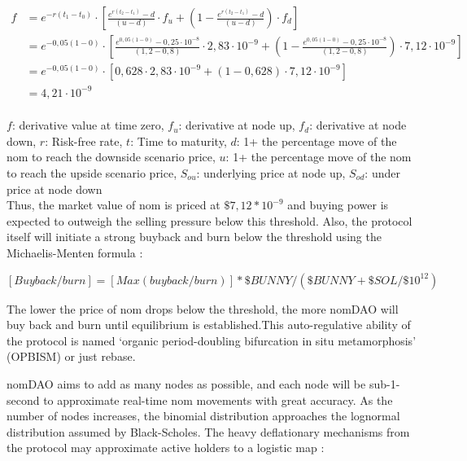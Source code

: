 \documentclass[12pt]{article}
\begin{document}
\begin{equation}\label{black}
\begin{split}
f &=e^{-r(t_{1} -t_{0})} \cdot [\frac{e^{r(t_{2} - t_{1})}-d}{(u-d)} \cdot f_{u} + (1-\frac{e^{r(t_{2} - t_{1})}-d}{(u-d)}) \cdot f_{d}]\\
 &= e^{-0,05(1 - 0)} \cdot [\frac{e^{0,05(1 - 0)}-0,25\cdot10^{-8}}{(1,2-0,8)} \cdot 2,83\cdot10^{-9} + (1-\frac{e^{0,05(1 - 0)}-0,25\cdot10^{-8}}{(1,2-0,8)}) \cdot 7,12\cdot10^{-9}]\\
  &=e^{-0,05(1 - 0)} \cdot [0,628 \cdot 2,83\cdot10^{-9} + (1-0,628) \cdot 7,12\cdot10^{-9}]\\
 &=4,21\cdot10^{-9}
\end{split}
\end{equation}
\\

$f$: derivative value at time zero,
$f_{u}$: derivative at node up,
$f_{d}$: derivative at node down,
$r$: Risk-free rate,
$t$: Time to maturity,
$d$: 1+ the percentage move of the nom to reach the downside scenario price,
$u$:  1+ the percentage move of the nom to reach the upside scenario price,
$S_{ou}$: underlying price at node up,
$S_{od}$: under price at node down\\

Thus, the market value of nom is priced at $\$7,12*10^{-9}$ and buying power is expected to outweigh the selling pressure below this threshold. Also, the protocol itself will initiate a strong buyback and burn below the threshold using the Michaelis-Menten formula \cite{mm}:

\begin{equation}\label{mm}
[Buyback/burn]=[Max (buyback/burn)] * \$BUNNY/ (\$BUNNY+ \$SOL/\$10^{12})
\end{equation}\label{mm}

The lower the price of nom drops below the threshold, the more nomDAO will buy back and burn until equilibrium is established.This auto-regulative ability of the protocol is named ‘organic period-doubling bifurcation in situ metamorphosis’ (OPBISM) or just rebase.

nomDAO aims to add as many nodes as possible, and each node will be sub-1-second to approximate real-time nom movements with great accuracy. As the number of nodes increases, the binomial distribution approaches the lognormal distribution assumed by Black-Scholes. The heavy deflationary mechanisms from the protocol may approximate active holders to a logistic map \cite{logmap}:
\end{document}
